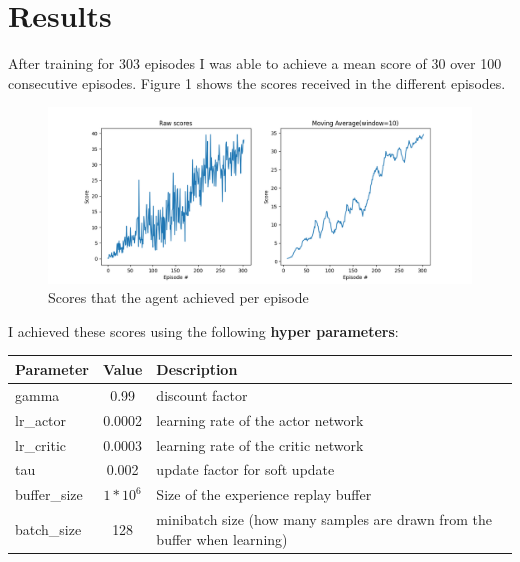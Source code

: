 \documentclass[12pt,a4paper]{article}
\begin{document}
    \section{Results}\label{sec:results}
    After training for 303 episodes I was able to achieve a mean score of 30 over 100 consecutive episodes.
    Figure 1 shows the scores received in the different episodes.

    \begin{figure}[H]
        \includegraphics[width=\linewidth]{img/scores}
        \caption{Scores that the agent achieved per episode}
        \label{fig:scores}
    \end{figure}

    I achieved these scores using the following \textbf{hyper parameters}:
    \begin{center}
        \begin{tabular}{||l c l||}
            \hline
            Parameter    & Value      & Description \\ [0.5ex]
            \hline\hline
            gamma        & 0.99       & discount factor                                                           \\
            \hline
            lr\_actor    & 0.0002     & learning rate of the actor network                                        \\
            \hline
            lr\_critic   & 0.0003     & learning rate of the critic network                                       \\
            \hline
            tau          & 0.002      & update factor for soft update                                             \\
            \hline
            buffer\_size & $1*10^{6}$ & Size of the experience replay buffer                                      \\
            \hline
            batch\_size  & 128        & minibatch size (how many samples are drawn from the buffer when learning) \\
            \hline
        \end{tabular}
    \end{center}
\end{document}
